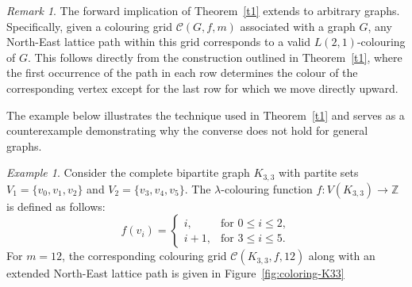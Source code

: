 \documentclass{birkjour}
\theoremstyle{definition}
\theoremstyle{remark}
\newtheorem{remark}[theorem]{Remark}
\newtheorem*{example}{Example}
\numberwithin{equation}{section}
\begin{document}
\begin{remark}
The forward implication of Theorem~\ref{t1} extends to arbitrary graphs. Specifically, given a colouring grid \( \mathcal{C}(G, f, m) \) associated with a graph \( G \), any North-East lattice path within this grid corresponds to a valid \( L(2,1) \)-colouring of \( G \). This follows directly from the construction outlined in Theorem~\ref{t1}, where the first occurrence of the path in each row determines the colour of the corresponding vertex except for the last row for which we move directly upward.
\end{remark}

The example below illustrates the technique used in Theorem~\ref{t1} and serves as a counterexample demonstrating why the converse does not hold for general graphs.
\begin{example}
Consider the complete bipartite graph \( K_{3,3} \) with partite sets \( V_1 = \{v_0, v_1, v_2\} \) and \( V_2 = \{v_3, v_4, v_5\} \). The \( \lambda \)-colouring function \( f: V(K_{3,3}) \to \mathbb{Z} \) is defined as follows:
\[
f(v_i) =
\begin{cases}
i, & \text{for } 0 \leq i \leq 2, \\
i+1, & \text{for } 3 \leq i \leq 5.
\end{cases}
\]
For \( m = 12 \), the corresponding colouring grid \( \mathcal{C}(K_{3,3}, f, 12) \) along with an extended North-East lattice path is given in Figure~\ref{fig:coloring-K33}
\begin{figure}[h]
\centering
{}
\end{figure}
\end{example}
\end{document}
